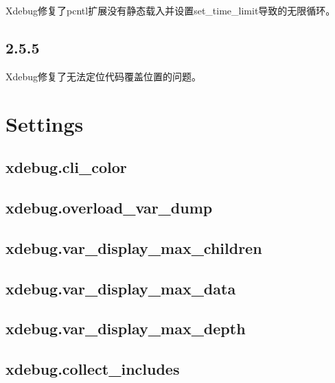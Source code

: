\begin{compactitem}
\item Xdebug修复了pcntl扩展没有静态载入并设置set\_time\_limit导致的无限循环。
\end{compactitem}


\subsection{2.5.5}

\begin{compactitem}
\item Xdebug修复了无法定位代码覆盖位置的问题。
\end{compactitem}



\section{Settings}


\subsection{xdebug.cli\_color}



\subsection{xdebug.overload\_var\_dump}



\subsection{xdebug.var\_display\_max\_children}



\subsection{xdebug.var\_display\_max\_data}



\subsection{xdebug.var\_display\_max\_depth}



\subsection{xdebug.collect\_includes}


